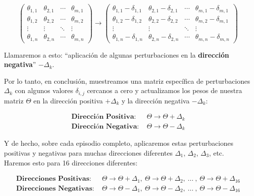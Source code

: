 \documentclass[
]{book}
\begin{document}
\[
\begin{pmatrix}
\theta_{1,1} & \theta_{2,1} & \cdots & \theta_{m,1} \\
\theta_{1,2} & \theta_{2,2} & \cdots & \theta_{m,2} \\
\vdots & \vdots & \ddots & \vdots \\
\theta_{1,n} & \theta_{2,n} & \cdots & \theta_{m,n}
\end{pmatrix}
\longrightarrow
\begin{pmatrix}
\theta_{1,1} - \delta_{1,1} & \theta_{2,1} - \delta_{2,1} & \cdots & \theta_{m,1} - \delta_{m,1} \\
\theta_{1,2} - \delta_{1,2} & \theta_{2,2} - \delta_{2,2} & \cdots & \theta_{m,2} - \delta_{m,1} \\
\vdots & \vdots & \ddots & \vdots \\
\theta_{1,n} - \delta_{1,n} & \theta_{2,n} - \delta_{2,n} & \cdots & \theta_{m,n} - \delta_{m,n}
\end{pmatrix}
\]

Llamaremos a esto: ``aplicación de algunas perturbaciones en la \textbf{dirección negativa}'' \(-\Delta_k\).

Por lo tanto, en conclusión, muestreamos una matriz específica de perturbaciones \(\Delta_k\) con algunos valores \(\delta_{i, j}\) cercanos a cero y actualizamos los pesos de nuestra matriz \(\Theta\) en la dirección positiva \(+\Delta_k\) y la dirección negativa \(-\Delta_k\):

\begin{align*}
\textbf{Dirección Positiva: } & \Theta \rightarrow \Theta + \Delta_k \\
\textbf{Dirección Negativa: } & \Theta \rightarrow \Theta - \Delta_k
\end{align*}

Y de hecho, sobre cada episodio completo, aplicaremos estas perturbaciones positivas y negativas para muchas direcciones diferentes \(\Delta_1\), \(\Delta_2\), \(\Delta_3\), etc. Haremos esto para 16 direcciones diferentes:

\begin{align*}
\textbf{Direcciones Positivas: } & \Theta \rightarrow \Theta + \Delta_1, \ \Theta \rightarrow \Theta + \Delta_2, \ ... \ , \ \Theta \rightarrow \Theta + \Delta_{16} \\
\textbf{Direcciones Negativas: } & \Theta \rightarrow \Theta - \Delta_1, \ \Theta \rightarrow \Theta - \Delta_2, \ ... \ , \ \Theta \rightarrow \Theta - \Delta_{16}
\end{align*}
\end{document}

